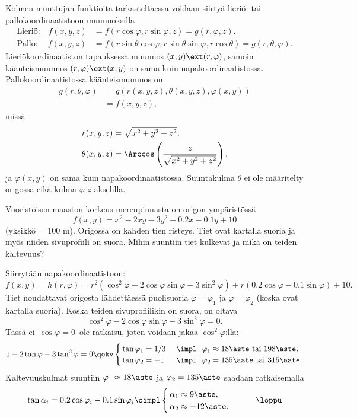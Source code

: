 Kolmen muuttujan funktioita tarkasteltaessa voidaan siirtyä lieriö- tai 
pallokoordinaatistoon muunnoksilla
\begin{align*}
\text{Lieriö:} \quad  f(x,y,z) &= f(r\cos\varphi,r\sin\varphi,z) =g(r,\varphi,z). \\
\text{Pallo:} \quad\  f(x,y,z) &= f(r\sin\theta\cos\varphi,r\sin\theta\sin\varphi,r\cos\theta)
                                = g(r,\theta,\varphi).
\end{align*}
Lieriökoordinaatiston tapauksessa muunnos $(x,y)\ext(r,\varphi)$, samoin käänteismuunnos
$(r,\varphi)\ext(x,y)$ on sama kuin napakoordinaatistossa. Pallokoordinaatistossa 
käänteismuunnos on
\begin{align*}
g(r,\theta,\varphi) &= g(r(x,y,z),\theta(x,y,z),\varphi(x,y)) \\
&=f(x,y,z),
\end{align*}
missä
\begin{align*}
     r(x,y,z) &= \sqrt{x^2+y^2+z^2}, \\
\theta(x,y,z) &= \Arccos\left(\frac{z}{\sqrt{x^2+y^2+z^2}}\right),
\end{align*}
ja $\varphi(x,y)$ on sama kuin napakoordinaatistossa. Suuntakulma $\theta$ ei ole määritelty
origossa eikä kulma $\varphi$ $z$-akselilla.
\begin{Exa}
Vuoristoisen maaston korkeus merenpinnasta on origon ympäristössä
\[
f(x,y)=x^2-2xy-3y^2+0.2x-0.1y+10
\]
(yksikkö = 100 m). Origossa on kahden tien risteys. Tiet ovat kartalla suoria ja myös niiden
sivuprofiili on suora. Mihin suuntiin tiet kulkevat ja mikä on teiden kaltevuus?
\end{Exa}
\ratk
Siirrytään napakoordinaatistoon:
\[
f(x,y)=h(r,\varphi)=r^2(\cos^2 \varphi-2\cos\varphi\sin\varphi-3\sin^2\varphi) 
                                      + r(0.2\cos\varphi-0.1\sin\varphi) +10.
\]
Tiet noudattavat origosta lähdettäessä puolisuoria $\varphi=\varphi_1$ ja $\varphi=\varphi_2$
(koska ovat kartalla suoria). Koska teiden sivuprofiilikin on suora, on oltava
\[
\cos^2 \varphi-2\cos\varphi\sin\varphi-3\sin^2\varphi=0.
\]
Tässä ei $\,\cos\varphi=0\,$ ole ratkaisu, joten voidaan jakaa $\cos^2\varphi$:lla:
\[
1-2\tan\varphi-3\tan^2\varphi=0 
           \qekv \begin{cases}
                  \,\tan\varphi_1=1/3 \ & \impl \ \ \varphi_1 \approx 18\aste\ 
                                                              \text{tai}\ 198\aste, \\
                  \,\tan\varphi_2=-1 \  & \impl \ \ \varphi_2 =135\aste\
                                                              \text{tai}\ 315\aste.
                  \end{cases}
\]
Kaltevuuskulmat suuntiin $\varphi_1 \approx 18\aste$ ja $\varphi_2=135\aste$ saadaan
ratkaisemalla
\[
\tan\alpha_i=0.2\cos\varphi_i-0.1\sin\varphi_i
                  \qimpl \begin{cases}
                         \,\alpha_1\approx 9\aste, \\
                         \,\alpha_2\approx -12\aste.
                         \end{cases} \qquad\loppu
\]

